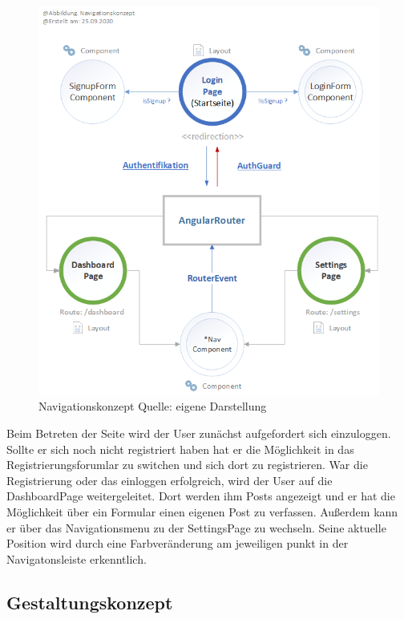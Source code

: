 \documentclass[12pt,titlepage]{article}
\begin{document}
\begin{figure}[hbt!]
\centering
\includegraphics [width=400pt]{abbildungen/Abbildung_Navigationskonzept.png}
\caption[Navigationskonzept]{Navigationskonzept  Quelle: eigene Darstellung}
\end{figure}


\vspace{2cm}


Beim Betreten der Seite wird der User zunächst aufgefordert sich einzuloggen. Sollte er sich noch nicht registriert haben hat er die Möglichkeit in das Registrierungsforumlar zu switchen und sich dort zu registrieren. War die Registrierung oder das einloggen erfolgreich, wird der User auf die DashboardPage weitergeleitet. Dort werden ihm Posts angezeigt und er hat die Möglichkeit über ein Formular einen eigenen Post zu verfassen. Außerdem kann er über das Navigationsmenu zu der SettingsPage zu wechseln. Seine aktuelle Position wird durch eine Farbveränderung am jeweiligen punkt in der Navigatonsleiste erkenntlich.

\FloatBarrier
\subsection{Gestaltungskonzept}
\end{document}
